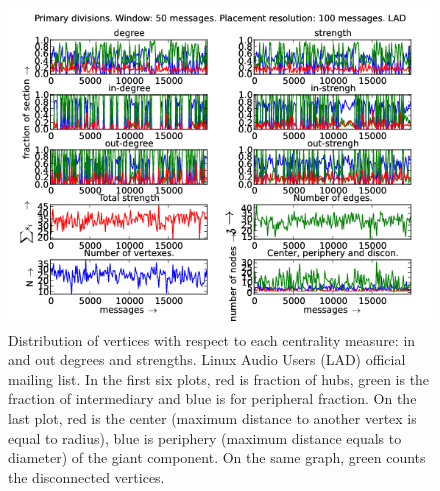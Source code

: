 \documentclass[%
 aip,
 jmp,%
 amsmath,amssymb,
 reprint,%
]{revtex4-1}
\begin{document}
\begin{figure}[hbtp] 
   \centering
        \includegraphics[width=\textwidth]{figs/LAD/50}
    \caption{Distribution of vertices with respect to each centrality measure: in and out degrees and strengths. Linux Audio Users (LAD) official mailing list. In the first six plots, red is fraction of hubs, green is the fraction of intermediary and blue is for peripheral fraction. On the last plot, red is the center (maximum distance to another vertex is equal to radius), blue is periphery (maximum distance equals to diameter) of the giant component. On the same graph, green counts the disconnected vertices.}
    \label{fig:lad50}
\end{figure}
\end{document}
